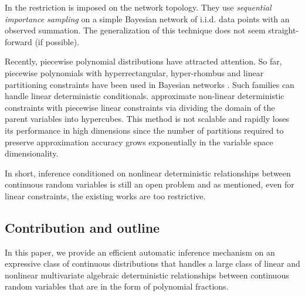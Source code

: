 In \citep{li2013dynamic} the restriction is imposed on the network topology.
They use \emph{sequential importance sampling} on a simple Bayesian network of i.i.d. data points with an observed summation. %
The generalization of this technique does not seem straight-forward (if possible).

Recently, piecewise polynomial distributions have attracted attention.
So far, piecewise polynomials with hyperrectangular, hyper-rhombus and linear partitioning constraints have been used in Bayesian networks \citep{shenoy2011inference,shenoy2012two,Sanner:12}.
Such families can handle linear deterministic conditionals.
\cite{cobb2005nonlinear} approximate non-linear deterministic constraints with piecewise linear constraints via
dividing the domain of the parent variables into hypercubes. %
This method is not scalable and rapidly loses its performance in high dimensions since 
the number of partitions required to preserve approximation accuracy
grows exponentially in the variable space dimensionality. 

In short, inference conditioned on nonlinear deterministic relationships between continuous random variables is still an open problem \citep{li2013dynamic} and as mentioned, even for linear constraints, the existing works are too restrictive.
 
\subsection{Contribution and outline}
In this paper, we provide an efficient automatic inference mechanism 
on an expressive class of continuous distributions 
that handles a large class of linear and nonlinear multivariate algebraic deterministic relationships between continuous random variables that are in the form of polynomial fractions. 

